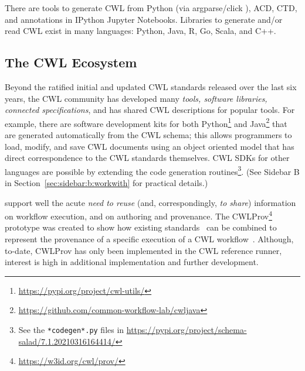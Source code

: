 \documentclass[sigconf,authordraft]{acmart}
\begin{document}
There are tools to generate CWL  from Python (via argparse/click ), ACD, CTD, and annotations in IPython Jupyter Notebooks. Libraries to generate and/or read CWL  exist in many languages: Python, Java, R, Go, Scala,  and C++.

\subsection{The CWL Ecosystem}\label{sec:open:ecosystem}

Beyond the ratified initial and updated CWL standards released over the last six years, the CWL community has developed many \textit{tools, software libraries, connected specifications}, and has shared CWL descriptions for popular tools. For example, there are software development kits for both Python\footnote{\url{https://pypi.org/project/cwl-utils/}} and Java\footnote{\url{https://github.com/common-workflow-lab/cwljava}} that are generated automatically from the CWL schema; this allows programmers to load, modify, and save CWL documents using an object oriented model that has direct correspondence to the CWL standards themselves. CWL SDKs for other languages are possible by extending the code generation routines\footnote{See the \texttt{*codegen*.py} files in \url{https://pypi.org/project/schema-salad/7.1.20210316164414/}}. (See Sidebar B in Section~\ref{sec:sidebar:b:workwith} for practical details.)

 support well the acute \textit{need to reuse} (and, correspondingly, \textit{to share}) information on workflow execution, and on authoring and provenance. The CWLProv\footnote{\url{https://w3id.org/cwl/prov/}} prototype was created to show how existing standards~\cite{belhajjame_using_2015,kunze_bagit_2018,missier_w3c_2013} can be combined to represent the provenance of a specific execution of a CWL workflow~\cite{khan_sharing_2019}. Although, to-date, CWLProv has only been implemented in the CWL reference runner, interest is high in additional implementation and further development.
\end{document}

